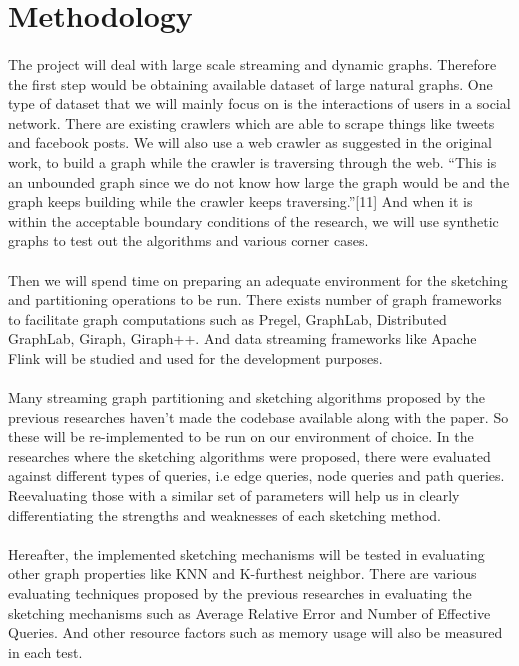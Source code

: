 \section{Methodology}

\paragraph{}
The project will deal with large scale streaming and dynamic graphs. 
Therefore the first step would be obtaining available dataset of large 
natural graphs. One type of dataset that we will mainly focus on is the 
interactions of users in a social network. There are existing crawlers 
which are able to scrape things like tweets and facebook posts. We will also 
use a web crawler as suggested in the original work, to build a graph while 
the crawler is traversing through the web. “This is an unbounded graph since 
we do not know how large the graph would be and the graph keeps building while 
the crawler keeps traversing.”[11] And when it is within the acceptable 
boundary conditions of the research, we will use synthetic graphs to test 
out the algorithms and various corner cases. 

\paragraph{}
Then we will spend time on preparing an adequate environment for the sketching 
and partitioning operations to be run. There exists number of graph frameworks 
to facilitate graph computations such as Pregel, GraphLab, 
Distributed GraphLab, Giraph, Giraph++.  And data streaming frameworks 
like Apache Flink will be studied and used for the development purposes.  

\paragraph{}
Many streaming graph partitioning and sketching algorithms proposed by the 
previous researches haven’t made the codebase available along with the paper. 
So these will be re-implemented to be run on our environment of choice. In 
the researches where the sketching algorithms were proposed, there were 
evaluated against different types of queries, i.e edge queries, node queries 
and path queries. Reevaluating those with a similar set of parameters will 
help us in clearly differentiating the strengths and weaknesses of each 
sketching method. 

\paragraph{}
Hereafter, the implemented sketching mechanisms will be tested in evaluating 
other graph properties like KNN and K-furthest neighbor. There are various 
evaluating techniques proposed by the previous researches in evaluating the 
sketching mechanisms such as Average Relative Error and Number of Effective 
Queries\cite{kumarage_efficient_2017}. And other resource factors such as memory 
usage will also be measured in each test. 

